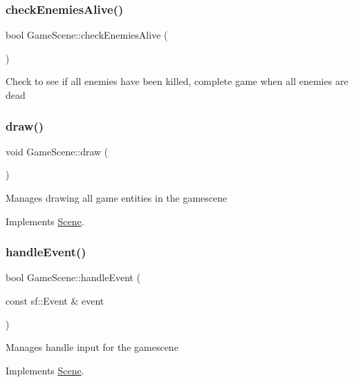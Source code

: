 \subsubsection{\texorpdfstring{check\+Enemies\+Alive()}{checkEnemiesAlive()}}
{\footnotesize\ttfamily bool Game\+Scene\+::check\+Enemies\+Alive (\begin{DoxyParamCaption}{ }\end{DoxyParamCaption})}

Check to see if all enemies have been killed, complete game when all enemies are dead \mbox{\label{class_game_scene_ae9eb60cbb8fa55eeb07b951e3d83f426}} 
\subsubsection{\texorpdfstring{draw()}{draw()}}
{\footnotesize\ttfamily void Game\+Scene\+::draw (\begin{DoxyParamCaption}{ }\end{DoxyParamCaption})\hspace{0.3cm}{\ttfamily [virtual]}}

Manages drawing all game entities in the gamescene 

Implements \hyperlink{class_scene_a789c16961aa1e316b2a4a05b95187546}{Scene}.

\mbox{\label{class_game_scene_aa494372b1f451f3c3a268558fddb30f2}} 
\subsubsection{\texorpdfstring{handle\+Event()}{handleEvent()}}
{\footnotesize\ttfamily bool Game\+Scene\+::handle\+Event (\begin{DoxyParamCaption}\item[{const sf\+::\+Event \&}]{event }\end{DoxyParamCaption})\hspace{0.3cm}{\ttfamily [virtual]}}

Manages handle input for the gamescene 

Implements \hyperlink{class_scene_af25e4d2c998aca4e95899fb67488e815}{Scene}.

\mbox{\label{class_game_scene_a030583d6469d9f44fda3fc5777c46a08}} 
